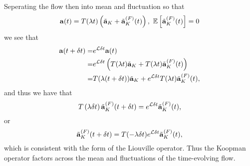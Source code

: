 \documentclass[aps,prl,preprint,groupedaddress]{revtex4-1}
\begin{document}
Seperating the flow then into mean and fluctuation so that 
\[
{\bf a}(t) = T(\lambda t)\left(\tilde{{\bf a}}_{K} + \tilde{{\bf a}}_{K}^{(F)}(t)\right), ~ \mathbb{E}\left[\tilde{{\bf a}}_{K}^{(F)}(t)\right] = 0
\]
we see that 
\begin{align*}
{\bf a}(t+\delta t) = & e^{\mathcal{L}\delta t}{\bf a}(t)\\\
= &e^{\mathcal{L}\delta t}\left( T(\lambda t)\tilde{{\bf a}}_{K} + T(\lambda t)\tilde{{\bf a}}_{K}^{(F)}(t)\right)\\
= & T(\lambda (t+\delta t))\tilde{{\bf a}}_{K} + e^{\mathcal{L}\delta t}T(\lambda t)\tilde{{\bf a}}_{K}^{(F)}(t), 
\end{align*}
and thus we have that 
\[
T\left(\lambda \delta t\right)\tilde{{\bf a}}^{(F)}_{K}(t+\delta t) = e^{\mathcal{L}\delta t}\tilde{{\bf a}}_{K}^{(F)}(t),
\]
or 
\[
\tilde{{\bf a}}^{(F)}_{K}(t+\delta t) = T(-\lambda \delta t) e^{\mathcal{L}\delta t}\tilde{{\bf a}}_{K}^{(F)}(t),
\]
which is consistent with the form of the Liouville operator.  Thus the Koopman operator factors across the mean and fluctuations of the time-evolving flow.  


\end{document}
